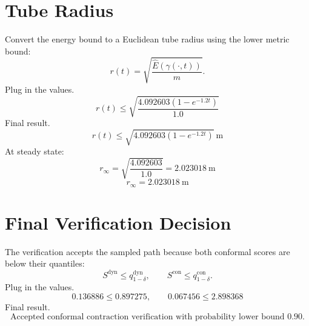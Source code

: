 \documentclass[11pt]{article}
\begin{document}
\section*{Tube Radius}

Convert the energy bound to a Euclidean tube radius using the lower metric bound:
\[
r(t)=\sqrt{\frac{\hat E(\gamma(\cdot,t))}{m}}.
\]
Plug in the values.
\[
r(t)
\le
\sqrt{\frac{4.092603(1-e^{-1.2t})}{1.0}}
\]
Final result.
\[
\boxed{
r(t)\le\sqrt{4.092603(1-e^{-1.2t})}\ \mathrm{m}
}
\]
At steady state:
\[
r_\infty
=
\sqrt{\frac{4.092603}{1.0}}
=2.023018\ \mathrm{m}
\]
\[
\boxed{r_\infty=2.023018\ \mathrm{m}}
\]

\section*{Final Verification Decision}

The verification accepts the sampled path because both conformal scores are below their quantiles:
\[
S^{\mathrm{dyn}}\le q_{1-\delta}^{\mathrm{dyn}},
\qquad
S^{\mathrm{con}}\le q_{1-\delta}^{\mathrm{con}}.
\]
Plug in the values.
\[
0.136886\le0.897275,
\qquad
0.067456\le2.898368
\]
Final result.
\[
\boxed{\text{Accepted conformal contraction verification with probability lower bound }0.90.}
\]
\end{document}
